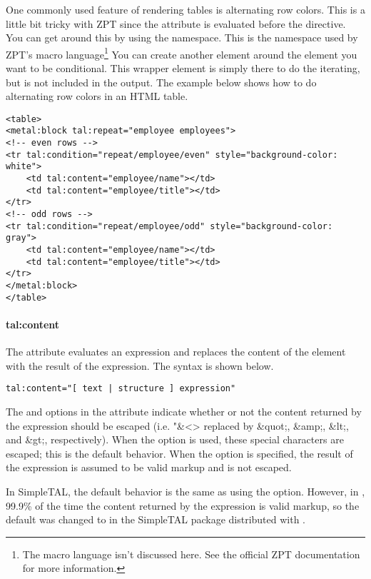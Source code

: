 One commonly used feature of rendering tables is alternating row colors.
This is a little bit tricky with ZPT since the 
attribute is evaluated before the  directive.  You
can get around this by using the  namespace.  This
is the namespace used by ZPT's macro language\footnote{The macro language
isn't discussed here.  See the official ZPT documentation for more 
information.}  You can create another element around the element you 
want to be conditional.  This wrapper element is simply there to do the 
iterating, but is not included in the output.  The example below shows
how to do alternating row colors in an HTML table.
\begin{verbatim}
<table>
<metal:block tal:repeat="employee employees">
<!-- even rows -->
<tr tal:condition="repeat/employee/even" style="background-color: white">
    <td tal:content="employee/name"></td>
    <td tal:content="employee/title"></td>
</tr>
<!-- odd rows -->
<tr tal:condition="repeat/employee/odd" style="background-color: gray">
    <td tal:content="employee/name"></td>
    <td tal:content="employee/title"></td>
</tr>
</metal:block>
</table>
\end{verbatim}


\paragraph{tal:content}

The  attribute evaluates an expression and replaces
the content of the element with the result of the expression.  The
syntax is shown below.
\begin{verbatim}
tal:content="[ text | structure ] expression"
\end{verbatim}

The  and  options in the 
attribute indicate whether or not the content returned by the 
expression should be escaped (i.e. "\&<> replaced by \&quot;, \&amp;, \&lt;,
and \&gt;, respectively).  When the  option is used, these
special characters are escaped; this is the default behavior.  When
the  option is specified, the result of the expression is
assumed to be valid markup and is not escaped.  

In SimpleTAL, the default
behavior is the same as using the  option.  However, in 
\plasTeX, 99.9\% of the time the content returned by the expression is
valid markup, so the default was changed to  in the 
SimpleTAL package distributed with \plasTeX.



